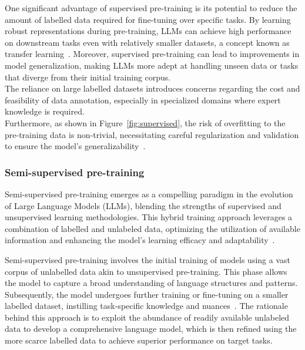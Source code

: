 One significant advantage of supervised pre-training is its potential to reduce the amount of labelled data required for fine-tuning over specific tasks.
By learning robust representations during pre-training, LLMs can achieve high performance on downstream tasks even with relatively smaller datasets, a concept known as transfer learning~\cite{ruder2019transfer}.
Moreover, supervised pre-training can lead to improvements in model generalization, making LLMs more adept at handling unseen data or tasks that diverge from their initial training corpus.\\

The reliance on large labelled datasets introduces concerns regarding the cost and feasibility of data annotation, especially in specialized domains where expert knowledge is required.\\
Furthermore, as shown in Figure~\ref{fig:supervised}, the risk of overfitting to the pre-training data is non-trivial, necessitating careful regularization and validation to ensure the model's generalizability~\cite{howard2018universal}.

\subsubsection{Semi-supervised pre-training}
\label{subsubsec:semi-supervised-pre-training}

Semi-supervised pre-training emerges as a compelling paradigm in the evolution of Large Language Models (LLMs), blending the strengths of supervised and unsupervised learning methodologies.
This hybrid training approach leverages a combination of labelled and unlabeled data, optimizing the utilization of available information and enhancing the model's learning efficacy and adaptability~\cite{zhu2005semi, chapelle2009semi}.

Semi-supervised pre-training involves the initial training of models using a vast corpus of unlabelled data akin to unsupervised pre-training.
This phase allows the model to capture a broad understanding of language structures and patterns.
Subsequently, the model undergoes further training or fine-tuning on a smaller labelled dataset, instilling task-specific knowledge and nuances~\cite{ruder2019transfer, yang2017transfer}.
The rationale behind this approach is to exploit the abundance of readily available unlabeled data to develop a comprehensive language model, which is then refined using the more scarce labelled data to achieve superior performance on target tasks.

